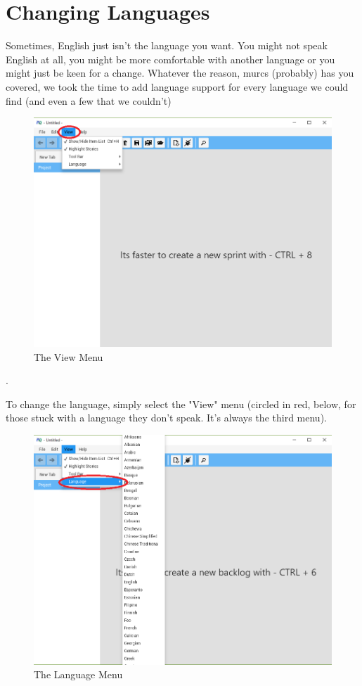 \section{Changing Languages}

Sometimes, English just isn't the language you want. You might not speak English at all, you might be more comfortable with another language or you might just be keen for a change. Whatever the reason, murcs (probably) has you covered, we took the time to add language support for every language we could find (and even a few that we couldn't)

\begin{figure}[H]
	\centering
	\includegraphics[width=\textwidth]{images/screenshots/language1.png}
	\caption{The View Menu}
	\label{fig:new_project}
\end{figure}.

To change the language, simply select the "View" menu (circled in red, below, for those stuck with a language they don't speak. It's always the third menu).

\begin{figure}[H]
\centering
\includegraphics[width=\textwidth]{images/screenshots/language2.png}
\caption{The Language Menu}
\label{fig:new_project}
\end{figure}\textbf{}

